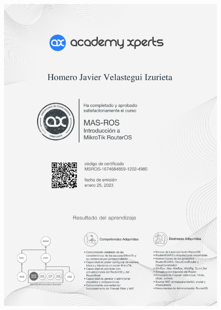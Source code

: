 \begin{figure}[ht]
    \setlength{\parindent}{-20pt}
    \includegraphics[width=\textwidth]{2.-Estudios/Certificados/10.pdf}
\end{figure}

